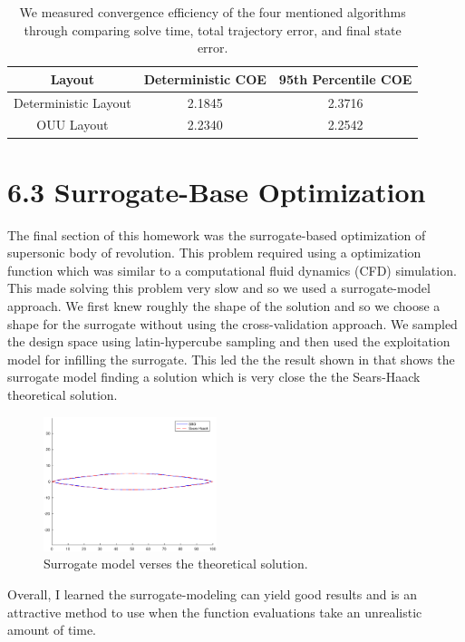 \documentclass{article}
\begin{document}
 
\begin{table}[htb]
	\centering
	\caption{We measured convergence efficiency of the four mentioned algorithms through comparing solve time, total trajectory error, and final state error.}
	\label{tab:comp_der}
	\begin{tabular}{c|c|c}
		\toprule
		Layout & Deterministic COE & 95th Percentile COE \\
		\midrule
		Deterministic Layout & 2.1845 & 2.3716 \\
		OUU Layout & 2.2340 & 2.2542 \\
		\bottomrule
	\end{tabular}
\end{table}


\section*{6.3 Surrogate-Base Optimization}

The final section of this homework was the surrogate-based optimization of supersonic body of revolution. This problem required using a optimization function which was similar to a computational fluid dynamics (CFD) simulation. This made solving this problem very slow and so we used a surrogate-model approach. We first knew roughly the shape of the solution and so we choose a shape for the surrogate without using the cross-validation approach. We sampled the design space using latin-hypercube sampling and then used the exploitation model for infilling the surrogate. This led the the result shown in  that shows the surrogate model finding a solution which is very close the the Sears-Haack theoretical solution.

\begin{figure}[htbp]
	\centering
	\includegraphics[width=0.45\textwidth]{figures/surrogate_modeling.eps}
	\caption{Surrogate model verses the theoretical solution.}
	\label{fig:sur_model}
\end{figure}

Overall, I learned the surrogate-modeling can yield good results and is an attractive method to use when the function evaluations take an unrealistic amount of time.




\end{document}

